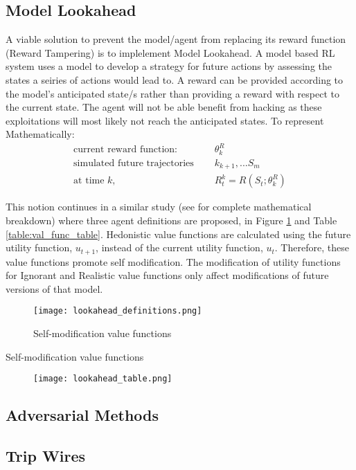 \subsection{Model Lookahead}
A viable solution to prevent the model/agent from replacing its reward function (Reward Tampering) is to implelement Model Lookahead.
A model based RL system uses a model to develop a strategy for future actions by assessing the states a seiries of actions would lead to.
A reward can be provided according to the model's anticipated state/s rather than providing a reward with respect to the current state.
The agent will not be able benefit from hacking as these exploitations will most likely not reach the anticipated states.
To represent Mathematically:
\begin{align*}
    \text{current reward function: } &\quad\theta^R_k \\
    \text{simulated future trajectories } &\quad  k_{k+1},... S_m  \\
    \text{at time } k, &\quad  R_t^k = R(S_t;\theta^R_k)
\end{align*}
    
This notion continues in a similar study (see for complete mathematical breakdown) \cite{EverittFDH16} where three agent definitions are proposed, in Figure \ref{fig:value_func} and Table \ref{table:val_func_table}.
Hedonistic value functions are calculated using the future utility function, $u_{t+1}$, instead of the current utility function, $u_t$.
Therefore, these value functions promote self modification.
The modification of utility functions for Ignorant and Realistic value functions only affect modifications of future versions of that model.

\begin{figure}[H]
    \centering
    \caption{Self-modification value functions \cite{EverittFDH16}}
    \texttt{[image: lookahead\_definitions.png]}
    \label{fig:value_func}
\end{figure}

\begin{table}[h]
    \bigskip
    \caption{Self-modification value functions \cite{EverittFDH16}}
    \begin{figure}[H]
        \centering
        \texttt{[image: lookahead\_table.png]}
    \end{figure}
    \label{table:val_func_table}
\end{table}

\subsection{Adversarial Methods}

\subsection{Trip Wires}

